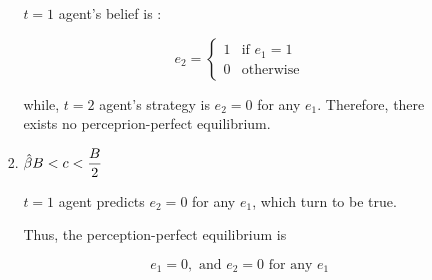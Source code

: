 \documentclass{jsarticle}
\begin{document}
\begin{enumerate}
\begin{enumerate}
\begin{enumerate}
 $t=1$ agent's belief is :
 
 \[e_2 = \begin{cases}
 1 & \text{if } e_1=1 \\
 0 & \text{otherwise}
 \end{cases} \]
 
 while, $t=2$ agent's strategy is $e_2=0$ for any $e_1$. Therefore, there exists no perceprion-perfect equilibrium.
 
 \item $\Hat{\beta} B < c < \dfrac{B}{2}$
 
 $t=1$ agent predicts $e_2=0$ for any $e_1$, which turn to be true.
 
 Thus, the perception-perfect equilibrium is
 
 \[e_1=0, \text{ and } e_2=0 \text{ for any }e_1 \]
 
 \end{enumerate}

\end{enumerate}

\end{enumerate}
\end{document}
